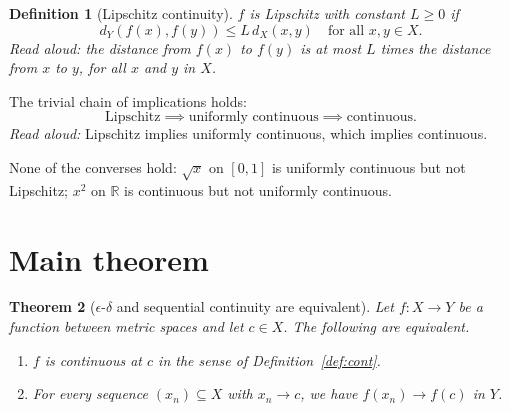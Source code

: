 \documentclass[11pt]{article}
\newtheorem{theorem}{Theorem}
\newtheorem{definition}[theorem]{Definition}
\begin{document}
\begin{definition}[Lipschitz continuity]\label{def:lip}
$f$ is \emph{Lipschitz with constant $L \geq 0$} if
\[
  d_Y(f(x), f(y)) \leq L\, d_X(x, y) \quad \text{for all } x, y \in X.
\]
\emph{Read aloud:} the distance from $f(x)$ to $f(y)$ is at most $L$ times the distance from $x$ to $y$, for all $x$ and $y$ in $X$.
\end{definition}

The trivial chain of implications holds:
\[
  \text{Lipschitz} \implies \text{uniformly continuous} \implies \text{continuous}.
\]
\emph{Read aloud:} Lipschitz implies uniformly continuous, which implies continuous.

None of the converses hold: $\sqrt{x}$ on $[0,1]$ is uniformly continuous but
not Lipschitz; $x^2$ on $\mathbb{R}$ is continuous but not uniformly continuous.

\section{Main theorem}

\begin{theorem}[$\epsilon$-$\delta$ and sequential continuity are equivalent]\label{thm:eq}
Let $f : X \to Y$ be a function between metric spaces and let $c \in X$. The
following are equivalent.
\begin{enumerate}
  \item[(A)] $f$ is continuous at $c$ in the sense of Definition~\ref{def:cont}.
  \item[(B)] For every sequence $(x_n) \subseteq X$ with $x_n \to c$, we have $f(x_n) \to f(c)$ in $Y$.
\end{enumerate}
\end{theorem}
\end{document}
